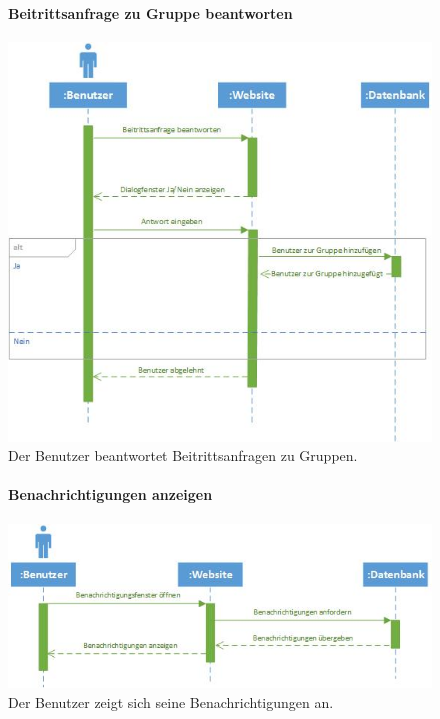 \documentclass[12pt,a4paper]{article}
\begin{document}
\begin{figure}[H]
	\centering
	\paragraph{Beitrittsanfrage zu Gruppe beantworten}
	\includegraphics[width=\textwidth]{Bilder/Sequenzdiagramme/BeitrittsanfrageZuGruppe1.jpg}
	\caption{Der Benutzer beantwortet Beitrittsanfragen zu Gruppen.}
	\label{SzBeitrittsanfrageZuGruppe}
\end{figure}
\begin{figure}[H]
	\centering
	\paragraph{Benachrichtigungen anzeigen}
	\includegraphics[width=\textwidth]{Bilder/Sequenzdiagramme/BenachrichtigungenAnzeigen1.jpg}
	\caption{Der Benutzer zeigt sich seine Benachrichtigungen an.}
	\label{SzBenachrichtigungen}
\end{figure}
\end{document}
